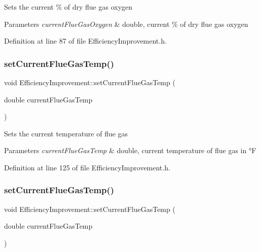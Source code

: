 Sets the current \% of dry flue gas oxygen


\begin{DoxyParams}{Parameters}
{\em current\+Flue\+Gas\+Oxygen} & double, current \% of dry flue gas oxygen \\
\hline
\end{DoxyParams}


Definition at line 87 of file Efficiency\+Improvement.\+h.

\mbox{\label{class_efficiency_improvement_aef6ffeae5135982ef223ce4a5efe23d8}} 
\subsubsection{\texorpdfstring{set\+Current\+Flue\+Gas\+Temp()}{setCurrentFlueGasTemp()}\hspace{0.1cm}{\footnotesize\ttfamily [1/3]}}
{\footnotesize\ttfamily void Efficiency\+Improvement\+::set\+Current\+Flue\+Gas\+Temp (\begin{DoxyParamCaption}\item[{double}]{current\+Flue\+Gas\+Temp }\end{DoxyParamCaption})\hspace{0.3cm}{\ttfamily [inline]}}

Sets the current temperature of flue gas


\begin{DoxyParams}{Parameters}
{\em current\+Flue\+Gas\+Temp} & double, current temperature of flue gas in °F \\
\hline
\end{DoxyParams}


Definition at line 125 of file Efficiency\+Improvement.\+h.

\mbox{\label{class_efficiency_improvement_aef6ffeae5135982ef223ce4a5efe23d8}} 
\subsubsection{\texorpdfstring{set\+Current\+Flue\+Gas\+Temp()}{setCurrentFlueGasTemp()}\hspace{0.1cm}{\footnotesize\ttfamily [2/3]}}
{\footnotesize\ttfamily void Efficiency\+Improvement\+::set\+Current\+Flue\+Gas\+Temp (\begin{DoxyParamCaption}\item[{double}]{current\+Flue\+Gas\+Temp }\end{DoxyParamCaption})\hspace{0.3cm}{\ttfamily [inline]}}

